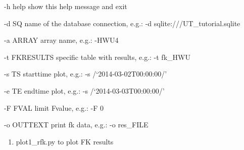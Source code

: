 \documentclass[letterpaper,10pt,english]{sphinxmanual}
\begin{document}
\begin{DUlineblock}{0em}
\item[] -h \textendash{}help     show this help message and exit
\item[] -d SQ         name of the database connection, e.g.: -d sqlite:///UT\_tutorial.sqlite
\item[] -a ARRAY      array name, e.g.: -HWU4
\item[] -t FKRESULTS  specific table with results, e.g.: -t fk\_HWU
\item[] -s TS        starttime plot, e.g.: -s /‘2014-03-02T00:00:00/’
\item[] -e TE        endtime plot, e.g.: -s /‘2014-03-03T00:00:00/’
\item[] -F FVAL      limit Fvalue, e.g.: -F 0
\item[] -o OUTTEXT    print fk data, e.g.: -o res\_FILE
\end{DUlineblock}

\begin{sphinxVerbatim}[commandchars=\\\{\}]
  \PYG{p}{[}\PYG{p}{]}         \PYG{p}{[} \PYG{p}{]} \PYG{p}{[} \PYG{p}{]} \PYG{p}{[} \PYG{p}{]}  
\end{sphinxVerbatim}
\begin{enumerate}
\def\theenumi{\arabic{enumi}}
\def\labelenumi{\theenumi .}
\makeatletter\def\p@enumii{\p@enumi \theenumi .}\makeatother
\setcounter{enumi}{2}
\item {} 
plot1\_rfk.py to plot FK results

\end{enumerate}
\end{document}
